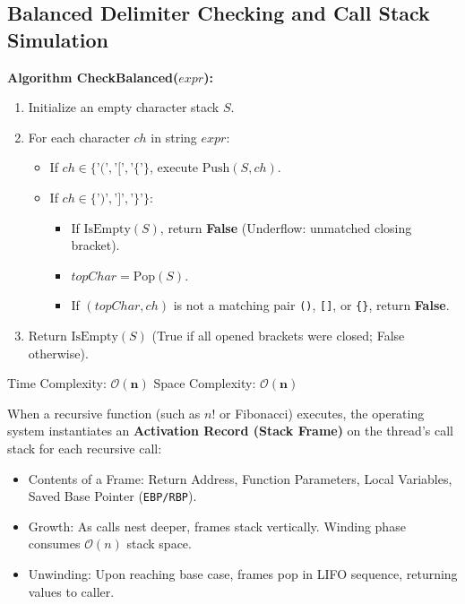 \documentclass[12pt,a4paper]{article}
\begin{document}
\subsection{Balanced Delimiter Checking and Call Stack Simulation}
\begin{tcolorbox}[defbox, title={\textbf{Algorithm: Delimiter Matching (Parentheses Balancing)}}]
\textbf{Algorithm CheckBalanced($expr$):}
\begin{enumerate}[leftmargin=*, nosep]
  \item Initialize an empty character stack $S$.
  \item For each character $ch$ in string $expr$:
  \begin{itemize}[leftmargin=*, nosep]
    \item If $ch \in \{ \texttt{'('}, \texttt{'['}, \texttt{'\{'} \}$, execute $\text{Push}(S, ch)$.
    \item If $ch \in \{ \texttt{')'}, \texttt{']'}, \texttt{'\}'} \}$:
    \begin{itemize}[leftmargin=*, nosep]
      \item If $\text{IsEmpty}(S)$, return \textbf{False} (Underflow: unmatched closing bracket).
      \item $topChar = \text{Pop}(S)$.
      \item If $(topChar, ch)$ is not a matching pair \texttt{()}, \texttt{[]}, or \texttt{\{\}}, return \textbf{False}.
    \end{itemize}
  \end{itemize}
  \item Return $\text{IsEmpty}(S)$ (True if all opened brackets were closed; False otherwise).
\end{enumerate}
Time Complexity: $\mathbf{\mathcal{O}(n)}$ \quad Space Complexity: $\mathbf{\mathcal{O}(n)}$
\end{tcolorbox}

\begin{tcolorbox}[examplebox, title={\textbf{Function Call Stack and Recursion Architecture}}]
When a recursive function (such as $n!$ or Fibonacci) executes, the operating system instantiates an \textbf{Activation Record (Stack Frame)} on the thread's call stack for each recursive call:
\begin{itemize}[leftmargin=*, nosep]
  \item Contents of a Frame: Return Address, Function Parameters, Local Variables, Saved Base Pointer (\texttt{EBP/RBP}).
  \item Growth: As calls nest deeper, frames stack vertically. Winding phase consumes $\mathcal{O}(n)$ stack space.
  \item Unwinding: Upon reaching base case, frames pop in LIFO sequence, returning values to caller.
\end{itemize}
\end{tcolorbox}
\end{document}
